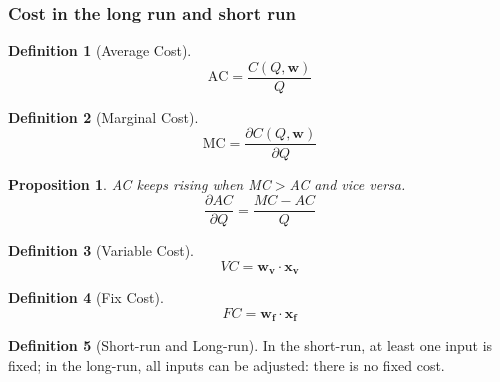 \documentclass{article}
\theoremstyle{plain}
\newtheorem{prop}[thm]{Proposition}
\theoremstyle{definition}
\newtheorem{defn}{Definition}[section]
\theoremstyle{remark}
\begin{document}
\subsubsection{Cost in the long run and short run}
\begin{defn}[Average Cost]
\begin{equation}
	\text{AC} = \frac{C(Q,\bm{w})}{Q}
\end{equation}
\end{defn}
\begin{defn}[Marginal Cost]
\begin{equation}
	\text{MC} = \frac{\partial C(Q,\bm{w})}{\partial Q}
\end{equation}
\end{defn}

\begin{prop}
AC keeps rising when MC$>$AC and vice versa.
\begin{equation}
	\frac{\partial AC}{\partial Q} = \frac{MC-AC}{Q}
\end{equation}
\end{prop}

\begin{defn}[Variable Cost]
\begin{equation}
	VC  = \bm{w_v}\cdot \bm{x_v}
\end{equation}
\end{defn}
\begin{defn}[Fix Cost]
\begin{equation}
	FC  = \bm{w_f}\cdot \bm{x_f}
\end{equation}
\end{defn}

\begin{defn}[Short-run and Long-run]
In the short-run, at least one input is fixed; in the long-run, all inputs can be adjusted: there is no fixed cost.
\end{defn}
\end{document}
